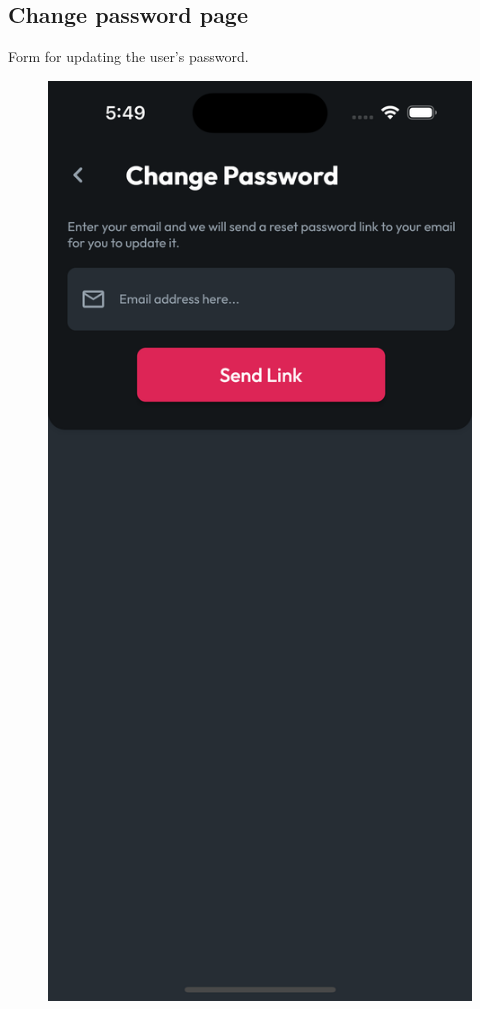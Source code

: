 \documentclass{Configuration_Files/PoliMi3i_thesis}
\begin{document}
\subsection{Change password page}

\begin{minipage}{\linewidth}
    Form for updating the user's password.
\end{minipage}

\begin{figure}[!h]
  \centering
  \includegraphics[scale=0.1]{Images/Screenshots/Mobile/ChangePassword.png}

\end{figure}
\end{document}
